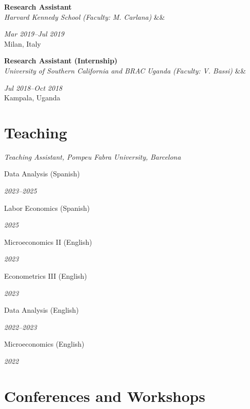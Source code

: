 \documentclass[11pt, a4paper]{article}
\newcommand{\cventry}[5]{%
  \begin{minipage}[t]{0.78\textwidth}
    \textbf{#1}\\[-2pt]
    \textit{\small #2}%
    \ifx&#5&\else\\[1pt]{\small #5}\fi
  \end{minipage}%
  \hfill%
  \begin{minipage}[t]{0.2\textwidth}
    \raggedleft\small
    \textit{#4}\\
    #3
  \end{minipage}%
  \par\vspace{5pt}%
}
\begin{document}
\cventry{Research Assistant}%
  {Harvard Kennedy School \textmd{(Faculty: M. Carlana)}}%
  {Milan, Italy}{Mar 2019--Jul 2019}{}%

\cventry{Research Assistant (Internship)}%
  {University of Southern California and BRAC Uganda \textmd{(Faculty: V. Bassi)}}%
  {Kampala, Uganda}{Jul 2018--Oct 2018}{}%



\section{Teaching}


\textit{Teaching Assistant, Pompeu Fabra University, Barcelona}

\vspace{4pt}
\newcommand{\course}[2]{%
  \begin{minipage}[t]{0.84\textwidth}
    \small #1
  \end{minipage}%
  \hfill%
  \begin{minipage}[t]{0.14\textwidth}
    \raggedleft\small\textit{#2}
  \end{minipage}\par\vspace{2pt}%
}

\course{Data Analysis (Spanish)}{2023--2025}
\course{Labor Economics (Spanish)}{2025}
\course{Microeconomics II (English)}{2023}
\course{Econometrics III (English)}{2023}
\course{Data Analysis (English)}{2022--2023}
\course{Microeconomics (English)}{2022}

\vspace{6pt}

\section{Conferences and Workshops}
\end{document}
